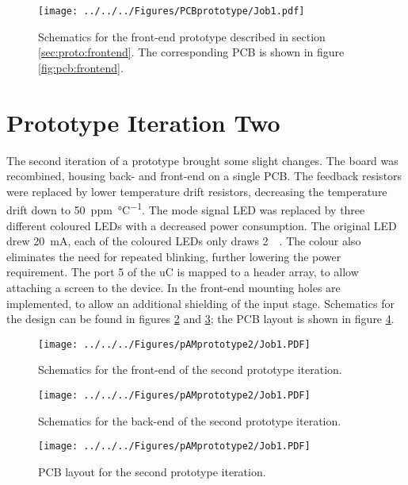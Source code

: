 \begin{figure}
	\centering
	\texttt{[image: ../../../Figures/PCBprototype/Job1.pdf]}
	\caption{Schematics for the front-end prototype described in section \ref{sec:proto:frontend}. The corresponding PCB is shown in figure \ref{fig:pcb:frontend}.}
	\label{fig:schematics:frontend}
\end{figure}

\section{Prototype Iteration Two}
\label{app:secondprotoype}
The second iteration of a prototype brought some slight changes. The board was recombined, housing back- and front-end on a single PCB. The feedback resistors were replaced by lower temperature drift resistors, decreasing the temperature drift down to \SI{50}{ppm\per\degreeCelsius}. 
The mode signal LED was replaced by three different coloured LEDs with a decreased power consumption. The original LED drew \SI{20}{\milli\ampere}, each of the coloured LEDs only draws \SI{2}{\milli\amp}. The colour also eliminates the need for repeated blinking, further lowering the power requirement. 
The port 5 of the \ac{uC} is mapped to a header array, to allow attaching a screen to the device.
In the front-end mounting holes are implemented, to allow an additional shielding of the input stage. Schematics for the design can be found in figures \ref{fig:appendix:proto2:fe} and \ref{fig:appendix:proto2:be}; the PCB layout is shown in figure \ref{fig:appendix:proto2:pcb}.

\begin{figure}
	\centering
	\texttt{[image: ../../../Figures/pAMprototype2/Job1.PDF]}
	\caption{Schematics for the front-end of the second prototype iteration.}
	\label{fig:appendix:proto2:fe}
\end{figure}
\begin{figure}
	\centering
	\texttt{[image: ../../../Figures/pAMprototype2/Job1.PDF]}
	\caption{Schematics for the back-end of the second prototype iteration.}
	\label{fig:appendix:proto2:be}
\end{figure}
\begin{figure}
	\centering
	\texttt{[image: ../../../Figures/pAMprototype2/Job1.PDF]}
	\caption{PCB layout for the second prototype iteration.}
	\label{fig:appendix:proto2:pcb}
\end{figure}

\newpage

